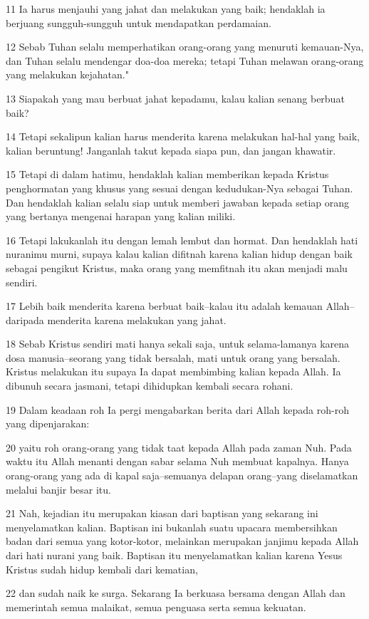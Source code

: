 \par 11 Ia harus menjauhi yang jahat dan melakukan yang baik; hendaklah ia berjuang sungguh-sungguh untuk mendapatkan perdamaian.
\par 12 Sebab Tuhan selalu memperhatikan orang-orang yang menuruti kemauan-Nya, dan Tuhan selalu mendengar doa-doa mereka; tetapi Tuhan melawan orang-orang yang melakukan kejahatan."
\par 13 Siapakah yang mau berbuat jahat kepadamu, kalau kalian senang berbuat baik?
\par 14 Tetapi sekalipun kalian harus menderita karena melakukan hal-hal yang baik, kalian beruntung! Janganlah takut kepada siapa pun, dan jangan khawatir.
\par 15 Tetapi di dalam hatimu, hendaklah kalian memberikan kepada Kristus penghormatan yang khusus yang sesuai dengan kedudukan-Nya sebagai Tuhan. Dan hendaklah kalian selalu siap untuk memberi jawaban kepada setiap orang yang bertanya mengenai harapan yang kalian miliki.
\par 16 Tetapi lakukanlah itu dengan lemah lembut dan hormat. Dan hendaklah hati nuranimu murni, supaya kalau kalian difitnah karena kalian hidup dengan baik sebagai pengikut Kristus, maka orang yang memfitnah itu akan menjadi malu sendiri.
\par 17 Lebih baik menderita karena berbuat baik--kalau itu adalah kemauan Allah--daripada menderita karena melakukan yang jahat.
\par 18 Sebab Kristus sendiri mati hanya sekali saja, untuk selama-lamanya karena dosa manusia--seorang yang tidak bersalah, mati untuk orang yang bersalah. Kristus melakukan itu supaya Ia dapat membimbing kalian kepada Allah. Ia dibunuh secara jasmani, tetapi dihidupkan kembali secara rohani.
\par 19 Dalam keadaan roh Ia pergi mengabarkan berita dari Allah kepada roh-roh yang dipenjarakan:
\par 20 yaitu roh orang-orang yang tidak taat kepada Allah pada zaman Nuh. Pada waktu itu Allah menanti dengan sabar selama Nuh membuat kapalnya. Hanya orang-orang yang ada di kapal saja--semuanya delapan orang--yang diselamatkan melalui banjir besar itu.
\par 21 Nah, kejadian itu merupakan kiasan dari baptisan yang sekarang ini menyelamatkan kalian. Baptisan ini bukanlah suatu upacara membersihkan badan dari semua yang kotor-kotor, melainkan merupakan janjimu kepada Allah dari hati nurani yang baik. Baptisan itu menyelamatkan kalian karena Yesus Kristus sudah hidup kembali dari kematian,
\par 22 dan sudah naik ke surga. Sekarang Ia berkuasa bersama dengan Allah dan memerintah semua malaikat, semua penguasa serta semua kekuatan.


